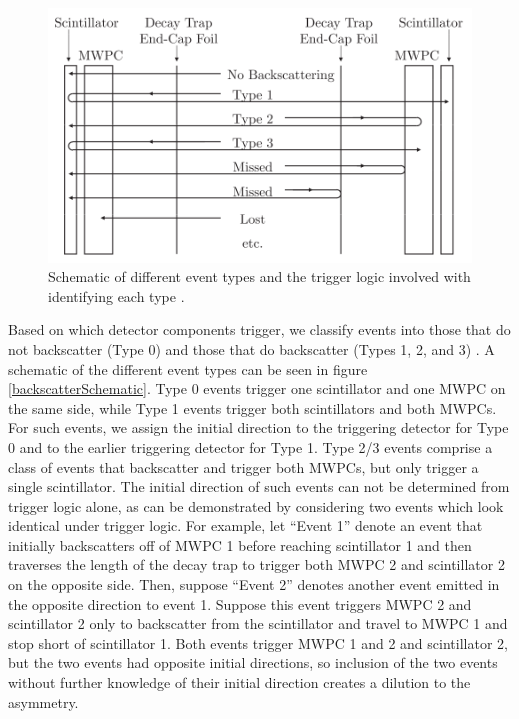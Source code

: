 \begin{figure}[h]
\centering
\includegraphics[scale=.4]{3-UCNAAnalysis/backscatterSchematic.png}
\caption{Schematic of different event types and the trigger logic involved with identifying
  each type \cite{plaster2012}.}
\label{fig:backscatterSchematic}
\end{figure}

Based on which detector components trigger, we classify events
into those that do not backscatter
(Type 0) and those that do backscatter (Types 1, 2, and 3) \cite{plaster2012}.
A schematic of the different event types can be seen in figure \ref{backscatterSchematic}.
Type 0 events
trigger one scintillator and one MWPC on the same side, while Type 1 events trigger
both scintillators and both MWPCs. For such events, we assign the initial
direction to the triggering detector for Type 0 and to the earlier triggering detector
for Type 1. Type 2/3 events comprise a class of events that backscatter and trigger both
MWPCs, but only trigger a single scintillator.
The initial direction of such events can
not be determined from trigger logic alone, as can be demonstrated by considering two events
which look identical under trigger logic.
For example, let ``Event 1'' denote an event that initially backscatters off
of MWPC 1 before reaching scintillator 1
and then traverses the length of the decay
trap to trigger both MWPC 2 and scintillator 2 on the opposite side.
Then, suppose ``Event 2'' denotes another event emitted
in the opposite direction to event 1. Suppose this event
triggers MWPC 2 and scintillator 2
only to backscatter from the scintillator and travel to MWPC 1 and stop short
of scintillator 1. Both events trigger MWPC 1 and 2 and scintillator 2,
but the two events had opposite initial directions, so inclusion of the
two events without further knowledge of their initial direction creates
a dilution to the asymmetry.


